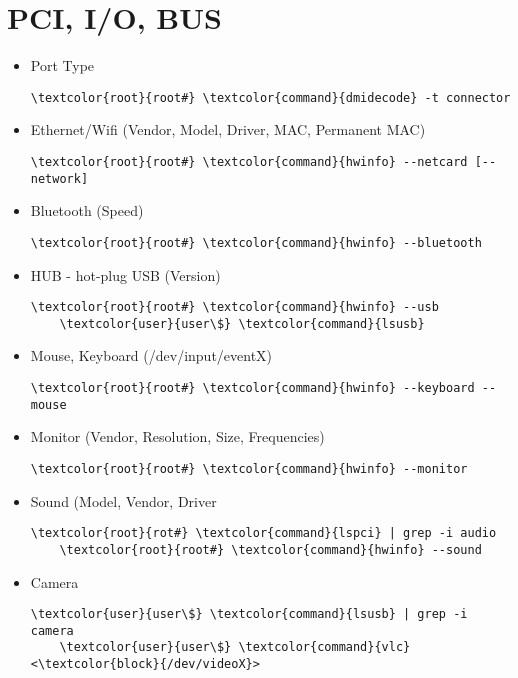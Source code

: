 \documentclass[10pt, a4paper, onecolumn, openany]{book}         %
\begin{document}
\section{PCI, I/O, BUS}
    \begin{itemize}
    \item Port Type
    \begin{Verbatim}[commandchars=\\\{\}]
    \textcolor{root}{root#} \textcolor{command}{dmidecode} -t connector
    \end{Verbatim}
    \item Ethernet/Wifi (Vendor, Model, Driver, MAC, Permanent MAC)
    \begin{Verbatim}[commandchars=\\\{\}]
    \textcolor{root}{root#} \textcolor{command}{hwinfo} --netcard [--network]
    \end{Verbatim}
    \item Bluetooth (Speed)
    \begin{Verbatim}[commandchars=\\\{\}]
    \textcolor{root}{root#} \textcolor{command}{hwinfo} --bluetooth
    \end{Verbatim}
    \item HUB - hot-plug USB (Version)
    \begin{Verbatim}[commandchars=\\\{\}]
    \textcolor{root}{root#} \textcolor{command}{hwinfo} --usb
    \textcolor{user}{user\$} \textcolor{command}{lsusb}
    \end{Verbatim}
    \item Mouse, Keyboard (/dev/input/eventX)
    \begin{Verbatim}[commandchars=\\\{\}]
    \textcolor{root}{root#} \textcolor{command}{hwinfo} --keyboard --mouse
    \end{Verbatim}
    \item Monitor (Vendor, Resolution, Size, Frequencies)
    \begin{Verbatim}[commandchars=\\\{\}]
    \textcolor{root}{root#} \textcolor{command}{hwinfo} --monitor
    \end{Verbatim}
    \item Sound (Model, Vendor, Driver
    \begin{Verbatim}[commandchars=\\\{\}]
    \textcolor{root}{rot#} \textcolor{command}{lspci} | grep -i audio
    \textcolor{root}{root#} \textcolor{command}{hwinfo} --sound
    \end{Verbatim}
    \item Camera
    \begin{Verbatim}[commandchars=\\\{\}]
    \textcolor{user}{user\$} \textcolor{command}{lsusb} | grep -i camera
    \textcolor{user}{user\$} \textcolor{command}{vlc} <\textcolor{block}{/dev/videoX}>
    \end{Verbatim}
\end{itemize}
\end{document}
